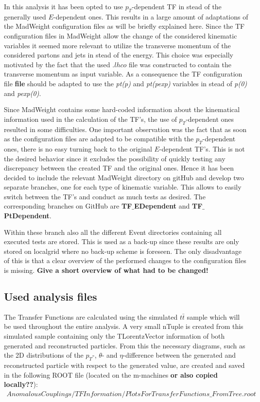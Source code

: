 In this analysis it has been opted to use $p_{T}$-dependent TF in stead of the generally used $E$-dependent ones. This results in a large amount of adaptations of the MadWeight configuration files as will be briefly explained here. Since the TF configuration files in MadWeight allow the change of the considered kinematic variables it seemed more relevant to utilize the transverse momentum of the considered partons and jets in stead of the energy. This choice was especially motivated by the fact that the used $.lhco$ file was constructed to contain the transverse momentum as input variable. As a consequence the TF configuration file \textbf{file} should be adapted to use the \textit{pt(p)} and \textit{pt(pexp)} variables in stead of \textit{p(0)} and \textit{pexp(0)}.

Since MadWeight contains some hard-coded information about the kinematical information used in the calculation of the TF's, the use of $p_T$-dependent ones resulted in some difficulties. One important observation was the fact that as soon as the configuration files are adapted to be compatible with the $p_T$-dependent ones, there is no easy turning back to the original $E$-dependent TF's. This is not the desired behavior since it excludes the possibility of quickly testing any discrepancy between the created TF and the original ones. Hence it has been decided to include the relevant MadWeight directory on gitHub and develop two separate branches, one for each type of kinematic variable. This allows to easily switch between the TF's and conduct as much tests as desired. The corresponding branches on GitHub are \textbf{TF$\_$EDependent} and \textbf{TF$\_$PtDependent}.

Within these branch also all the different Event directories containing all executed tests are stored. This is used as a back-up since these results are only stored on localgrid where no back-up scheme is foreseen. The only disadvantage of this is that a clear overview of the performed changes to the configuration files is missing. \textbf{Give a short overview of what had to be changed!}

\subsection{Used analysis files}
The Transfer Functions are calculated using the simulated $t\bar{t}$ sample which will be used throughout the entire analysis. A very small nTuple is created from this simulated sample containing only the TLorentzVector information of both generated and reconstructed particles. From this the necessary diagrams, such as the 2D distributions of the $p_T$-, $\theta$- and $\eta$-difference between the generated and reconstructed particle with respect to the generated value, are created and saved in the following ROOT file (located on the m-machines \textbf{or also copied locally??}):
\begin{eqnarray*}
 AnomalousCouplings/TFInformation/PlotsForTransferFunctions\_FromTree.root 
\end{eqnarray*}

